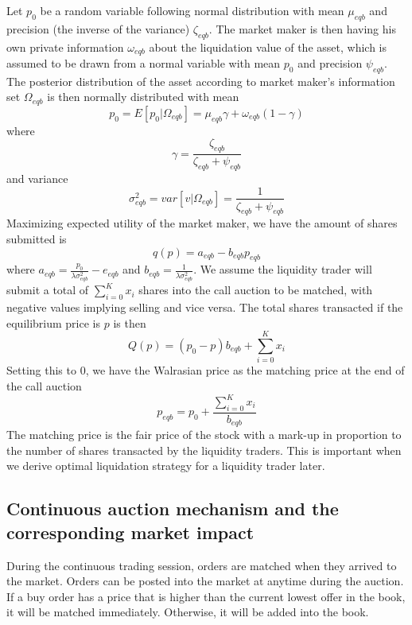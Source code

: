 \documentclass{article}
\begin{document}
Let $p_0$ be a random variable following normal distribution with mean $\mu_{eqb}$ and precision (the inverse of the variance) $\zeta_{eqb}$. The market maker is then having his own private information $\omega_{eqb}$ about the liquidation value of the asset, which is assumed to be drawn from a normal variable with mean $p_0$ and precision $\psi_{eqb}$. The posterior distribution of the asset according to market maker's information set $\Omega_{eqb}$ is then normally distributed with mean 
\[
p_0=E[p_0|\Omega_{eqb}]=\mu_{eqb} \gamma + \omega_{eqb}(1 - \gamma)
\]
where
\[
\gamma = \frac{\zeta_{eqb}}{\zeta_{eqb}+\psi_{eqb}}
\]
and variance
\[
\sigma_{eqb}^2=var[v|\Omega_{eqb}]=\frac{1}{\zeta_{eqb}+\psi_{eqb}}
\]
Maximizing expected utility of the market maker, we have the amount of shares submitted is
\[
q(p) = a_{eqb} - b_{eqb} p_{eqb}
\]
where $a_{eqb} = \frac{p_0}{\lambda \sigma_{eqb}^2} - e_{eqb}$ and $b_{eqb}=\frac{1}{\lambda \sigma_{eqb}^2}$. We assume the liquidity trader will submit a total of $\sum_{i=0}^K x_i$ shares into the call auction to be matched, with negative values implying selling and vice versa. The total shares transacted if the equilibrium price is $p$ is then
\[
Q(p) = (p_0 - p) b_{eqb} + \sum_{i=0}^K x_i
\]
Setting this to 0, we have the Walrasian price as the matching price at the end of the call auction
\begin{equation}\label{markup_px_eqb}
p_{eqb} = p_0 + \frac{\sum_{i=0}^K x_i}{b_{eqb}}
\end{equation}
The matching price is the fair price of the stock with a mark-up in proportion to the number of shares transacted by the liquidity traders. This is important when we derive optimal liquidation strategy for a liquidity trader later.

\subsection{Continuous auction mechanism and the corresponding market impact}
During the continuous trading session, orders are matched when they arrived to the market. Orders can be posted into the market at anytime during the auction. If a buy order has a price that is higher than the current lowest offer in the book, it will be matched immediately. Otherwise, it will be added into the book.
\end{document}
